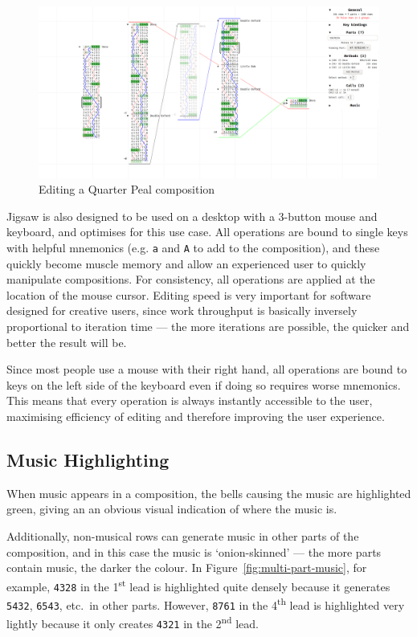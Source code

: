 \documentclass[12pt]{article}
\newcommand{\row}[1]{\texttt{#1}}
\newcommand{\nth}[2]{#1\textsuperscript{#2}}
\begin{document}
\begin{figure}
    \centering
    \includegraphics[width=\textwidth]{false-qp}
    \caption{Editing a Quarter Peal composition}\label{fig:cur-screenshot}
\end{figure}

Jigsaw is also designed to be used on a desktop with a 3-button mouse and keyboard, and optimises
for this use case.  All operations are bound to single keys with helpful mnemonics (e.g. \verb|a|
and \verb|A| to add to the composition), and these quickly become muscle memory and allow an
experienced user to quickly manipulate compositions.  For consistency, all operations are applied at
the location of the mouse cursor.  Editing speed is very important for software designed for
creative users, since work throughput is basically inversely proportional to iteration time --- the
more iterations are possible, the quicker and better the result will be.

Since most people use a mouse with their right hand, all operations are bound to keys on the left
side of the keyboard even if doing so requires worse mnemonics.  This means that every operation is
always instantly accessible to the user, maximising efficiency of editing and therefore improving
the user experience.

\subsection{Music Highlighting}

When music appears in a composition, the bells causing the music are highlighted green, giving an
an obvious visual indication of where the music is.

Additionally, non-musical rows can generate music in other parts of the composition, and in this
case the music is `onion-skinned' --- the more parts contain music, the darker the colour.  In
Figure~\ref{fig:multi-part-music}, for example, \row{4328} in the \nth{1}{st} lead is highlighted quite
densely because it generates \row{5432}, \row{6543}, etc.\ in other parts.  However, \row{8761} in
the \nth{4}{th} lead is highlighted very lightly because it only creates \row{4321} in the \nth{2}{nd}
lead.
\end{document}
